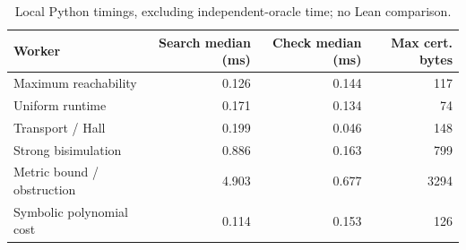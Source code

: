 \begin{table}[htbp]\centering\small
\begin{tabular}{@{}lrrr@{}}\toprule
Worker & Search median (ms) & Check median (ms) & Max cert. bytes\\\midrule
Maximum reachability & 0.126 & 0.144 & 117 \\
Uniform runtime & 0.171 & 0.134 & 74 \\
Transport / Hall & 0.199 & 0.046 & 148 \\
Strong bisimulation & 0.886 & 0.163 & 799 \\
Metric bound / obstruction & 4.903 & 0.677 & 3294 \\
Symbolic polynomial cost & 0.114 & 0.153 & 126 \\
\bottomrule\end{tabular}
\caption{Local Python timings, excluding independent-oracle time; no Lean comparison.}\end{table}
